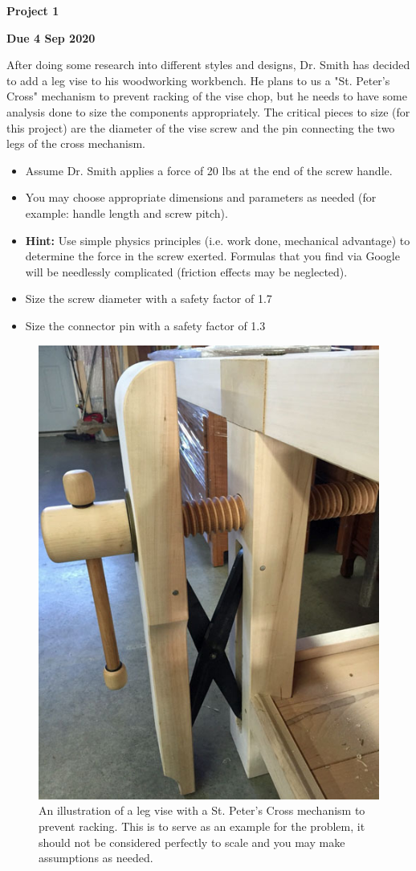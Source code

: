 \documentclass[12pt, oneside]{article}
\begin{document}
\begin{center}
\textbf{\Large Project 1}

\textbf{Due 4 Sep 2020}
\end{center}

After doing some research into different styles and designs, Dr. Smith has decided to add a leg vise to his woodworking workbench.
He plans to us a "St. Peter's Cross" mechanism to prevent racking of the vise chop, but he needs to have some analysis done to size the components appropriately.
The critical pieces to size (for this project) are the diameter of the vise screw and the pin connecting the two legs of the cross mechanism.
\begin{itemize}
	\item Assume Dr. Smith applies a force of 20 lbs at the end of the screw handle.
	\item You may choose appropriate dimensions and parameters as needed (for example: handle length and screw pitch). 
	\item \textbf{Hint:} Use simple physics principles (i.e. work done, mechanical advantage) to determine the force in the screw exerted. Formulas that you find via Google will be needlessly complicated (friction effects may be neglected).
	\item Size the screw diameter with a safety factor of 1.7
	\item Size the connector pin with a safety factor of 1.3
\end{itemize}
\begin{figure}[htpb]
	\centering
	\includegraphics[width=0.4\linewidth]{../../images/stpeterscross}
	\caption{An illustration of a leg vise with a St. Peter's Cross mechanism to prevent racking. This is to serve as an example for the problem, it should not be considered perfectly to scale and you may make assumptions as needed.}
\end{figure}
\end{document}

